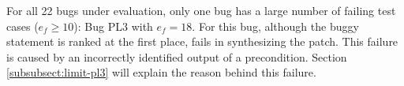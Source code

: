 For all 22 bugs under evaluation, only one bug has a large number of failing test cases  ($e_f\geq 10$): Bug PL3 with $e_f=18$. For this bug, although the buggy statement is ranked at the first place, \nopol fails in synthesizing the patch. 
This failure is caused by an incorrectly identified output of a precondition. 
Section \ref{subsubsect:limit-pl3} will explain the reason behind this failure.

\begin{table}[!t]
\caption{Analysis of the 17 fixed bugs (patched statement).}
\label{tab:patch-feature}
\centering
{}
\end{table}
